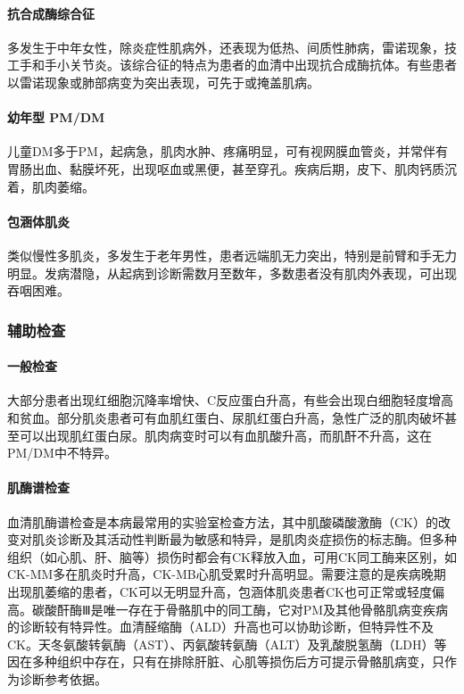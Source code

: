\paragraph{抗合成酶综合征}

多发生于中年女性，除炎症性肌病外，还表现为低热、间质性肺病，雷诺现象，技工手和手小关节炎。该综合征的特点为患者的血清中出现抗合成酶抗体。有些患者以雷诺现象或肺部病变为突出表现，可先于或掩盖肌病。

\paragraph{幼年型 PM/DM}

儿童DM多于PM，起病急，肌肉水肿、疼痛明显，可有视网膜血管炎，并常伴有胃肠出血、黏膜坏死，出现呕血或黑便，甚至穿孔。疾病后期，皮下、肌肉钙质沉着，肌肉萎缩。

\paragraph{包涵体肌炎}

类似慢性多肌炎，多发生于老年男性，患者远端肌无力突出，特别是前臂和手无力明显。发病潜隐，从起病到诊断需数月至数年，多数患者没有肌肉外表现，可出现吞咽困难。

\subsubsection{辅助检查}

\paragraph{一般检查}

大部分患者出现红细胞沉降率增快、C反应蛋白升高，有些会出现白细胞轻度增高和贫血。部分肌炎患者可有血肌红蛋白、尿肌红蛋白升高，急性广泛的肌肉破坏甚至可以出现肌红蛋白尿。肌肉病变时可以有血肌酸升高，而肌酐不升高，这在PM/DM中不特异。

\paragraph{肌酶谱检查}

血清肌酶谱检查是本病最常用的实验室检查方法，其中肌酸磷酸激酶（CK）的改变对肌炎诊断及其活动性判断最为敏感和特异，是肌肉炎症损伤的标志酶。但多种组织（如心肌、肝、脑等）损伤时都会有CK释放入血，可用CK同工酶来区别，如CK-MM多在肌炎时升高，CK-MB心肌受累时升高明显。需要注意的是疾病晚期出现肌萎缩的患者，CK可以无明显升高，包涵体肌炎患者CK也可正常或轻度偏高。碳酸酐酶Ⅲ是唯一存在于骨骼肌中的同工酶，它对PM及其他骨骼肌病变疾病的诊断较有特异性。血清醛缩酶（ALD）升高也可以协助诊断，但特异性不及CK。天冬氨酸转氨酶（AST）、丙氨酸转氨酶（ALT）及乳酸脱氢酶（LDH）等因在多种组织中存在，只有在排除肝脏、心肌等损伤后方可提示骨骼肌病变，只作为诊断参考依据。

